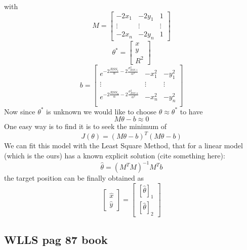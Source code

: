 \documentclass[12pt]{report}
\begin{document}
with $$M=\begin{bmatrix}
        -2x_1 & -2y_1 & 1\\
        \vdots&\vdots&\vdots\\
        -2x_n & -2y_n & 1
    \end{bmatrix}$$
$$\theta^* =     \begin{bmatrix}
        x\\
        y\\
        R^2
    \end{bmatrix}$$
$$b=    \begin{bmatrix}
        e^{-2\frac{RSS_1}{\alpha}-2\frac{\sigma^2_{RSS,1}}{\alpha^2}} & -x_1^2 & -y_1^2\\
        \vdots&\vdots&\vdots\\
        e^{-2\frac{RSS_n}{\alpha}-2\frac{\sigma^2_{RSS,n}}{\alpha^2}} & -x_n^2 & -y_n^2\\
    \end{bmatrix}$$
Now since $\theta^*$ is unknown we would like to choose $\theta\approx\theta^*$ to have 
\begin{equation}
    M\theta-b\approx0
\end{equation}
One easy way is to find it is to seek the minimum of 
\begin{equation}
    J(\theta)=(M\theta - b)^T(M\theta - b)
\end{equation}
We can fit this model with the Least Square Method, that for a linear model (which is the ours) has a known explicit solution (cite something here):
\begin{equation}
    \hat{\theta}=(M^TM)^{-1}M^Tb
\end{equation}
the target position can be finally obtained as 
\begin{equation}
\begin{bmatrix}
    \hat{x}\\
    \hat{y}
\end{bmatrix}=
\begin{bmatrix}
    [\hat{\theta}]_1\\
    [\hat{\theta}]_2
\end{bmatrix}
\end{equation}
\clearpage


\subsection{WLLS pag 87 book}
\clearpage
\end{document}
